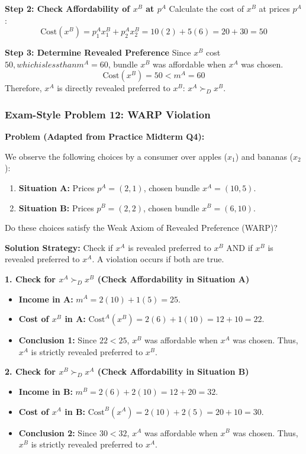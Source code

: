 \documentclass{article}
\begin{document}
\textbf{Step 2: Check Affordability of $x^B$ at $p^A$}
Calculate the cost of $x^B$ at prices $p^A$:
\[ \text{Cost}(x^B) = p_1^A x_1^B + p_2^A x_2^B = 10(2) + 5(6) = 20 + 30 = 50 \]

\textbf{Step 3: Determine Revealed Preference}
Since $x^B$ cost $50, which is less than m^A=60$, bundle $x^B$ was affordable when $x^A$ was chosen.
\[\text{Cost}(x^B) = 50 < m^A = 60\]
Therefore, $x^A$ is directly revealed preferred to $x^B$: $x^A \succ_D x^B$.

\hrulefill\vspace{2ex}

\subsubsection*{Exam-Style Problem 12: WARP Violation}

\textbf{Problem (Adapted from Practice Midterm Q4):}

We observe the following choices by a consumer over apples ($x_1$) and bananas ($x_2$):
\begin{enumerate}
    \item \textbf{Situation A:} Prices $p^A = (2, 1)$, chosen bundle $x^A = (10, 5)$.
    \item \textbf{Situation B:} Prices $p^B = (2, 2)$, chosen bundle $x^B = (6, 10)$.
\end{enumerate}

Do these choices satisfy the Weak Axiom of Revealed Preference (WARP)?

\textbf{Solution Strategy:} Check if $x^A$ is revealed preferred to $x^B$ AND if $x^B$ is revealed preferred to $x^A$. A violation occurs if both are true.

\textbf{1. Check for $x^A \succ_D x^B$ (Check Affordability in Situation A)}
\begin{itemize}
    \item \textbf{Income in A:} $m^A = 2(10) + 1(5) = 25$.
    \item \textbf{Cost of $x^B$ in A:} $\text{Cost}^A(x^B) = 2(6) + 1(10) = 12 + 10 = 22$.
    \item \textbf{Conclusion 1:} Since $22 < 25$, $x^B$ was affordable when $x^A$ was chosen. Thus, $x^A$ is strictly revealed preferred to $x^B$.
\end{itemize}

\textbf{2. Check for $x^B \succ_D x^A$ (Check Affordability in Situation B)}
\begin{itemize}
    \item \textbf{Income in B:} $m^B = 2(6) + 2(10) = 12 + 20 = 32$.
    \item \textbf{Cost of $x^A$ in B:} $\text{Cost}^B(x^A) = 2(10) + 2(5) = 20 + 10 = 30$.
    \item \textbf{Conclusion 2:} Since $30 < 32$, $x^A$ was affordable when $x^B$ was chosen. Thus, $x^B$ is strictly revealed preferred to $x^A$.
\end{itemize}
\end{document}
